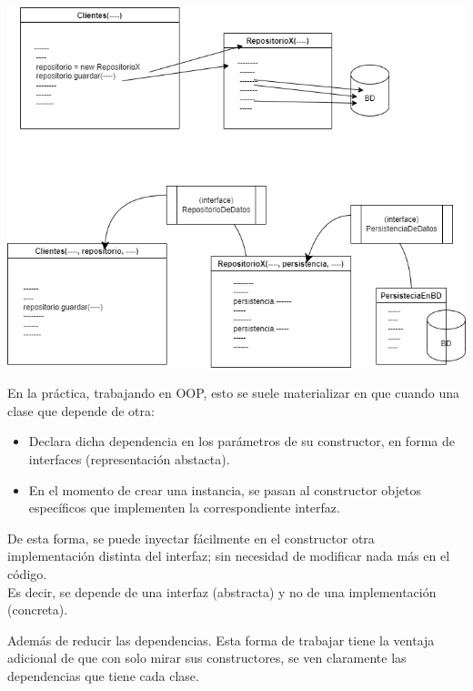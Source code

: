 \documentclass[spanish,12pt,a4paper,final,oneside]{book}
\begin{document}
\begin{center}
\includegraphics[width=\textwidth]{ejemplo de inyeccion de dependencias}
\end{center}

En la práctica, trabajando en OOP,  esto se suele materializar en que cuando una clase que depende de otra:
\begin{itemize}
\item Declara dicha dependencia en los parámetros de su constructor, en forma de interfaces (representación abstacta).
\item En el momento de crear una instancia, se pasan al constructor objetos específicos que implementen la correspondiente interfaz.
\end{itemize}
De esta forma, se puede inyectar fácilmente en el constructor otra implementación distinta del interfaz; sin necesidad de modificar nada más en el código.
\\Es decir, se depende de una interfaz (abstracta) y no de una implementación (concreta).

Además de reducir las dependencias. Esta forma de trabajar tiene la ventaja adicional de que con solo mirar sus constructores, se ven claramente las dependencias que tiene cada clase.
\end{document}

